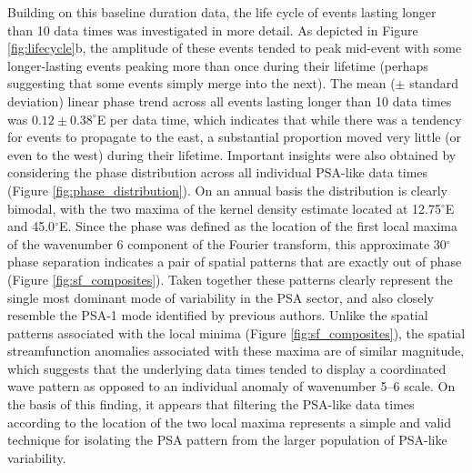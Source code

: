 Building on this baseline duration data, the life cycle of events lasting longer than 10 data times was investigated in more detail. As depicted in Figure \ref{fig:lifecycle}b, the amplitude of these events tended to peak mid-event with some longer-lasting events peaking more than once during their lifetime (perhaps suggesting that some events simply merge into the next). The mean ($\pm$ standard deviation) linear phase trend across all events lasting longer than 10 data times was $0.12 \pm 0.38^{\circ}$E per data time, which indicates that while there was a tendency for events to propagate to the east, a substantial proportion moved very little (or even to the west) during their lifetime. Important insights were also obtained by considering the phase distribution across all individual PSA-like data times (Figure \ref{fig:phase_distribution}). On an annual basis the distribution is clearly bimodal, with the two maxima of the kernel density estimate located at 12.75$^{\circ}$E and 45.0$^{\circ}$E. Since the phase was defined as the location of the first local maxima of the wavenumber 6 component of the Fourier transform, this approximate 30$^{\circ}$ phase separation indicates a pair of spatial patterns that are exactly out of phase (Figure \ref{fig:sf_composites}). Taken together these patterns clearly represent the single most dominant mode of variability in the PSA sector, and also closely resemble the PSA-1 mode identified by previous authors. Unlike the spatial patterns associated with the local minima (Figure \ref{fig:sf_composites}), the spatial streamfunction anomalies associated with these maxima are of similar magnitude, which suggests that the underlying data times tended to display a coordinated wave pattern as opposed to an individual anomaly of wavenumber 5--6 scale. On the basis of this finding, it appears that filtering the PSA-like data times according to the location of the two local maxima represents a simple and valid technique for isolating the PSA pattern from the larger population of PSA-like variability. 


